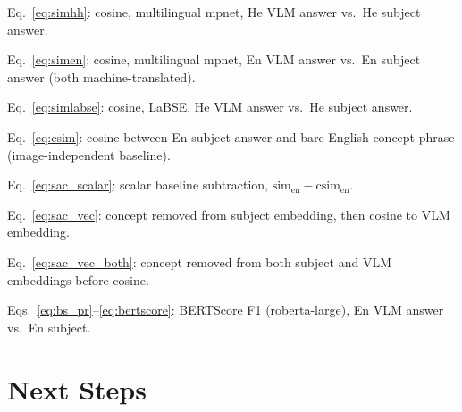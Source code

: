 \documentclass[12pt,a4paper]{article}
\newcommand{\simEN}{\ensuremath{\mathrm{sim}_{\text{en}}}}
\newcommand{\simHH}{\ensuremath{\mathrm{sim}_{\text{he--he}}}}
\newcommand{\simLaBSE}{\ensuremath{\mathrm{sim}_{\text{LaBSE}}}}
\newcommand{\csim}{\ensuremath{\mathrm{csim}_{\text{en}}}}
\newcommand{\SACs}{\ensuremath{\Delta_{\text{concept}}^{\text{scalar}}}}
\newcommand{\SACv}{\ensuremath{\Delta_{\text{concept}}^{\text{vec}}}}
\newcommand{\SACvb}{\ensuremath{\Delta_{\text{concept}}^{\text{vec-both}}}}
\newcommand{\bsF}{\ensuremath{F_1^{\text{BERT}}}}
\begin{document}
\begin{description}[leftmargin=3.2cm, labelwidth=3cm]
  \item[\simHH{}]       Eq.~\eqref{eq:simhh}: cosine, multilingual mpnet,
                        He VLM answer vs.\ He subject answer.
  \item[\simEN{}]       Eq.~\eqref{eq:simen}: cosine, multilingual mpnet,
                        En VLM answer vs.\ En subject answer (both machine-translated).
  \item[\simLaBSE{}]    Eq.~\eqref{eq:simlabse}: cosine, LaBSE,
                        He VLM answer vs.\ He subject answer.
  \item[\csim{}]        Eq.~\eqref{eq:csim}: cosine between En subject answer
                        and bare English concept phrase (image-independent baseline).
      \item[\SACs{}]        Eq.~\eqref{eq:sac_scalar}: scalar baseline subtraction,
                                                                        $\simEN{} - \csim{}$.
      \item[\SACv{}]        Eq.~\eqref{eq:sac_vec}: concept removed from subject
                                                                        embedding, then cosine to VLM embedding.
      \item[\SACvb{}]       Eq.~\eqref{eq:sac_vec_both}: concept removed from both
                                                                        subject and VLM embeddings before cosine.
  \item[\bsF{}]         Eqs.~\eqref{eq:bs_pr}--\eqref{eq:bertscore}: BERTScore F1
                        (roberta-large), En VLM answer vs.\ En subject.
\end{description}

\section{Next Steps}
\end{document}
